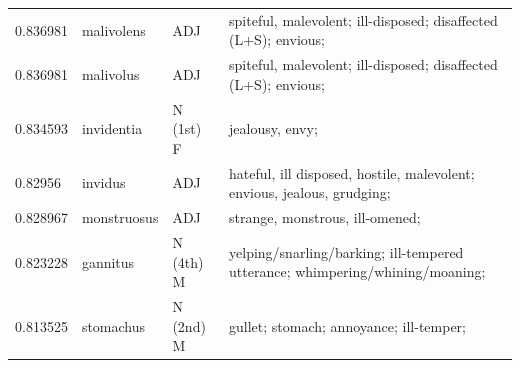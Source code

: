\documentclass[]{article}
\begin{document}
\begin{table}
\begin{tabular}{l|lll}
	   0.836981 & malivolens & ADJ & spiteful, malevolent; ill-disposed; disaffected (L+S); envious;\\
	   0.836981 & malivolus & ADJ & spiteful, malevolent; ill-disposed; disaffected (L+S); envious;\\
	   0.834593 & invidentia & N (1st) F & jealousy, envy;\\
	   0.82956 & invidus & ADJ & hateful, ill disposed, hostile, malevolent; envious, jealous, grudging;\\
	   0.828967 & monstruosus & ADJ & strange, monstrous, ill-omened;\\
	   0.823228 & gannitus & N (4th) M & yelping/snarling/barking; ill-tempered utterance; whimpering/whining/moaning;\\
	   0.813525 & stomachus & N (2nd) M & gullet; stomach; annoyance; ill-temper;\\
	\end{tabular}
	\end{table}
\end{document}
